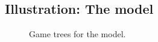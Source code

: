 \documentclass[article]{jss}
\begin{document}
\subsection[Illustration: The egame12 model]%
{Illustration: The  model}
\label{sec:egame12}

\begin{figure}[tp]
  \centering
  
  \caption{Game trees for the  model.}
  \label{fig:egame12-trees}
\end{figure}
\end{document}
